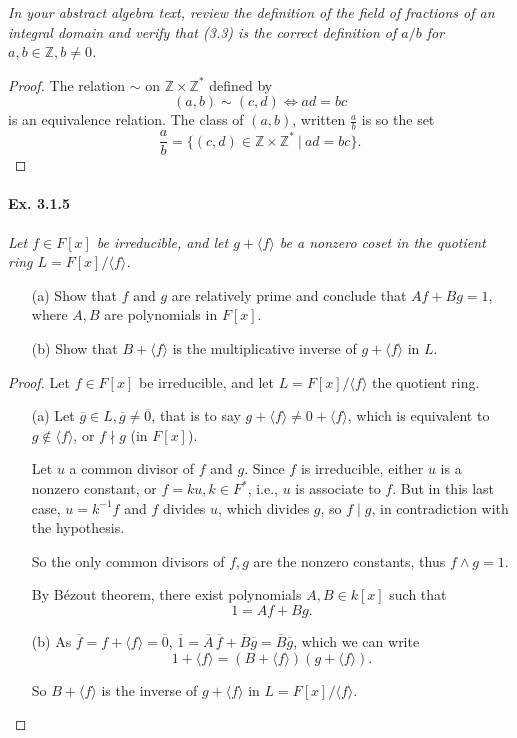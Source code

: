 \documentclass[11pt,a4paper]{article}
\newcommand{\Z}{\mathbb{Z}}
\begin{document}
{\it In your abstract algebra text, review the definition of the field of fractions of an integral domain and verify that (3.3) is the correct definition of $a/b$ for $a,b \in \Z, b\ne 0$.
}

\begin{proof}
The relation $\sim$ on $\mathbb{Z} \times \mathbb{Z}^*$ defined by
$$(a,b) \sim (c,d) \iff ad = bc$$
is an equivalence relation.
The class of $(a,b)$, written $\frac{a}{b}$ is so the set
$$\frac{a}{b} = \{(c,d)\in \mathbb{Z} \times \mathbb{Z}^* \ \vert \ ad = bc \}.$$
\end{proof}

\paragraph{Ex. 3.1.5}

{\it Let $f \in F[x]$ be irreducible, and let $g+\langle f \rangle$ be a nonzero coset in the quotient ring $L = F[x]/\langle f \rangle$.
\begin{enumerate}
\item[(a)] Show that $f$ and $g$ are relatively prime and conclude that $Af+Bg=1$, where $A,B$ are polynomials in $F[x]$.
\item[(b)] Show that $B + \langle f \rangle$ is the multiplicative inverse of $g + \langle f \rangle $ in $L$.
\end{enumerate}
}

\begin{proof}
Let $f \in F[x]$ be irreducible, and let $L =F[x]/\langle f \rangle$ the quotient ring.
\begin{enumerate}
\item[(a)]  Let  $\overline{g} \in L, \overline{g} \neq \overline{0}$, that is to say $g + \langle f \rangle \neq 0 + \langle f \rangle$, which is equivalent to $ g \not \in \langle f \rangle$, or  $f \nmid g$ (in $F[x]$).

Let $u$ a common divisor of $f$ and $g$. Since $f$ is irreducible, either $u$ is a nonzero constant, or $f = k u, k \in F^*$, i.e., $u$ is associate to $f$. But in this last case, $u = k^{-1} f$ and $f$ divides $u$, which divides $g$, so $f \mid g$, in contradiction with the hypothesis.

So the only common divisors of $f,g$ are the nonzero constants, thus $f \wedge g = 1$.

By  B\'ezout theorem, there exist polynomials $A,B \in k[x]$ such that
$$1 = A f + B g.$$

\item[(b)]  
As $\overline{f} = f + \langle f \rangle = \overline{0}$, $\overline{1} = \overline{A}\,  \overline{f} + \overline{B} \overline{g} = \overline{B} \overline{g}$, which we can write
$$1 + \langle f \rangle  =  (B + \langle f \rangle )(g+ \langle f \rangle).$$

So $B+\langle f \rangle$ is the inverse of $g+ \langle f \rangle$ in  $L =F[x]/\langle f \rangle$.
\end{enumerate}
\end{proof}
\end{document}
